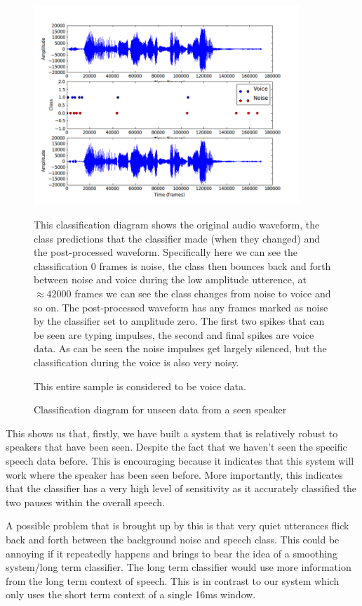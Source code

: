 \documentclass[ %
                    author={Sam Phippen},
                supervisor={Dr. Rafal Bogacz},
                     title={Real time voice activity detectors in noisy personal computing environments},
                  subtitle={},
                    degree={MEng},
                      year={2012} ]{thesis}
\begin{document}
\begin{figure}
    \begin{center}
        \includegraphics[width=10cm]{ultimation.png}
    \end{center}


    This classification diagram shows the original audio waveform, the class
    predictions that the classifier made (when they changed) and the
    post-processed waveform. Specifically here we can see the classification 0
    frames is noise, the class then bounces back and forth between noise and
    voice during the low amplitude utterence, at $\approx42000$ frames we can
    see the class changes from noise to voice and so on. The post-processed
    waveform has any frames marked as noise by the classifier set to amplitude
    zero. The first two spikes that can be seen are typing impulses, the second
    and final spikes are voice data. As can be seen the noise impulses get
    largely silenced, but the classification during the voice is also very
    noisy.

    This entire sample is considered to be voice data.

    \caption{Classification diagram for unseen data from a seen speaker}
    \label{fig:ultimation}
\end{figure}

This shows us that, firstly, we have built a system that is relatively robust
to speakers that have been seen. Despite the fact that we haven't seen the
specific speech data before. This is encouraging because it indicates that this
system will work where the speaker has been seen before. More importantly, this
indicates that the classifier has a very high level of sensitivity as it
accurately classified the two pauses within the overall speech.

A possible problem that is brought up by this is that very quiet utterances
flick back and forth between the background noise and speech class. This could
be annoying if it repeatedly happens and brings to bear the idea of a smoothing
system/long term classifier. The long term classifier would use more
information from the long term context of speech. This is in contrast to our
system which only uses the short term context of a single 16ms window.
\end{document}
